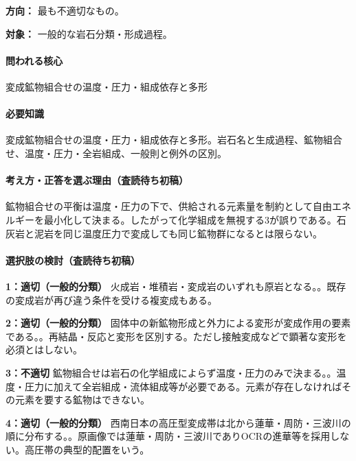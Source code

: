 \noindent\textbf{方向：} 最も不適切なもの。\par

\noindent\textbf{対象：} 一般的な岩石分類・形成過程。\par

\paragraph{問われる核心} 変成鉱物組合せの温度・圧力・組成依存と多形

\paragraph{必要知識} 変成鉱物組合せの温度・圧力・組成依存と多形。岩石名と生成過程、鉱物組合せ、温度・圧力・全岩組成、一般則と例外の区別。

\paragraph{考え方・正答を選ぶ理由（査読待ち初稿）} 鉱物組合せの平衡は温度・圧力の下で、供給される元素量を制約として自由エネルギーを最小化して決まる。したがって化学組成を無視する3が誤りである。石灰岩と泥岩を同じ温度圧力で変成しても同じ鉱物群になるとは限らない。

\paragraph{選択肢の検討（査読待ち初稿）}\mbox{}\par

\noindent\textbf{1：適切（一般的分類）} 火成岩・堆積岩・変成岩のいずれも原岩となる。。既存の変成岩が再び違う条件を受ける複変成もある。\par

\noindent\textbf{2：適切（一般的分類）} 固体中の新鉱物形成と外力による変形が変成作用の要素である。。再結晶・反応と変形を区別する。ただし接触変成などで顕著な変形を必須とはしない。\par

\noindent\textbf{3：不適切} 鉱物組合せは岩石の化学組成によらず温度・圧力のみで決まる。。温度・圧力に加えて全岩組成・流体組成等が必要である。元素が存在しなければその元素を要する鉱物はできない。\par

\noindent\textbf{4：適切（一般的分類）} 西南日本の高圧型変成帯は北から蓮華・周防・三波川の順に分布する。。原画像では蓮華・周防・三波川でありOCRの進華等を採用しない。高圧帯の典型的配置をいう。\par

